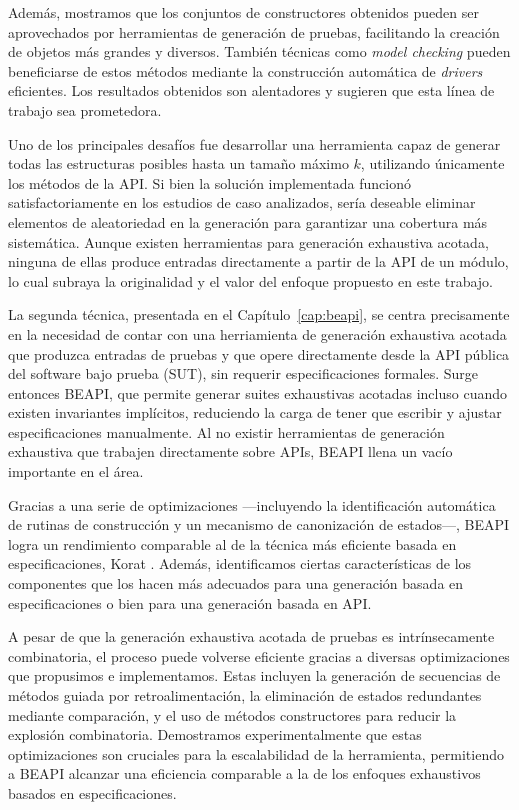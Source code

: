 Además, mostramos que los conjuntos de constructores obtenidos pueden ser aprovechados por herramientas de generación de pruebas, facilitando la creación de objetos más grandes y diversos. 
También técnicas como \emph{model checking} pueden beneficiarse de estos métodos mediante la construcción automática de \emph{drivers} eficientes. 
Los resultados obtenidos son alentadores y sugieren que esta línea de trabajo sea prometedora.

Uno de los principales desafíos fue desarrollar una herramienta capaz de generar todas las estructuras posibles hasta un tamaño máximo \(k\), 
utilizando únicamente los métodos de la API. Si bien la solución implementada funcionó satisfactoriamente en los estudios de caso analizados, 
sería deseable eliminar elementos de aleatoriedad en la generación para garantizar una cobertura más sistemática. 
Aunque existen herramientas para generación exhaustiva acotada, ninguna de ellas produce entradas directamente a partir de la API de un módulo, 
lo cual subraya la originalidad y el valor del enfoque propuesto en este trabajo.

La segunda técnica, presentada en el Capítulo~\ref{cap:beapi}, se centra precisamente en la necesidad de contar con una herriamienta
de generación exhaustiva acotada que produzca entradas de pruebas y que opere directamente desde la API pública del software bajo prueba (SUT), sin requerir especificaciones formales.
Surge entonces BEAPI, que permite generar suites exhaustivas acotadas incluso cuando existen invariantes implícitos, 
reduciendo la carga de tener que escribir y ajustar especificaciones manualmente.
Al no existir herramientas de generación exhaustiva que trabajen directamente sobre APIs, BEAPI llena un vacío importante en el área.

Gracias a una serie de optimizaciones —incluyendo la identificación automática de rutinas de construcción y un mecanismo de canonización de estados—, 
BEAPI logra un rendimiento comparable al de la técnica más eficiente basada en especificaciones, Korat \cite{Boyapati02}. 
Además, identificamos ciertas características de los componentes que los hacen más adecuados para una generación basada en especificaciones o bien para una generación basada en API.

A pesar de que la generación exhaustiva acotada de pruebas es intrínsecamente combinatoria, 
el proceso puede volverse eficiente gracias a diversas optimizaciones que propusimos e implementamos. 
Estas incluyen la generación de secuencias de métodos guiada por retroalimentación, la eliminación de estados redundantes mediante comparación, 
y el uso de métodos constructores para reducir la explosión combinatoria. 
Demostramos experimentalmente que estas optimizaciones son cruciales para la escalabilidad de la herramienta, 
permitiendo a BEAPI alcanzar una eficiencia comparable a la de los enfoques exhaustivos basados en especificaciones.

